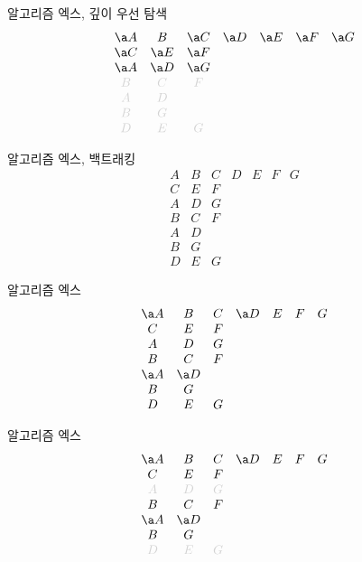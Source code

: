 \documentclass[xcolor=svgnames]{beamer}
\begin{document}
%
\begin{frame}{알고리즘 엑스, 깊이 우선 탐색}
  \Large\boldmath
  $$
  \begin{array}{ccccccc}
    \a A & B & \a C & \a D & \a E & \a F & \a G\\
    \a C & \a E & \a F &&&&\\
    \a A & \a D & \a G &&&&\\
    \g B & \g C & \g F &&&&\\
    \g A & \g D &&&&&\\
    \g B & \g G &&&&&\\
    \g D & \g E & \g G &&&&
  \end{array}
  $$
\end{frame}

%
\begin{frame}{알고리즘 엑스, 백트래킹}
\Large\boldmath
  $$
  \begin{array}{ccccccc}
    A & B & C & D & E & F & G\\
    C & E & F &&&&\\
    A & D & G &&&&\\
    B & C & F &&&&\\
    A & D &&&&&\\
    B & G &&&&&\\
    D & E & G &&&&
  \end{array}
  $$
\end{frame}

%
\begin{frame}{알고리즘 엑스}
\Large\boldmath
  $$
  \begin{array}{ccccccc}
    \a A & B & C & \a D & E & F & G\\
    C & E & F &&&&\\
    A & D & G &&&&\\
    B & C & F &&&&\\
    \a A & \a D &&&&&\\
    B & G &&&&&\\
    D & E & G &&&&
  \end{array}
  $$
\end{frame}

%
\begin{frame}{알고리즘 엑스}
\Large\boldmath
  $$
  \begin{array}{ccccccc}
    \a A & B & C & \a D & E & F & G\\
    C & E & F &&&&\\
    \g A & \g D & \g G &&&&\\
    B & C & F &&&&\\
    \a A & \a D &&&&&\\
    B & G &&&&&\\
    \g D & \g E & \g G &&&&
  \end{array}
  $$
\end{frame}
\end{document}
